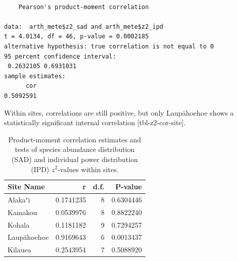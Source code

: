 \documentclass[
  letterpaper,
  DIV=11,
  numbers=noendperiod]{scrartcl}
\newenvironment{Shaded}{\begin{snugshade}}{\end{snugshade}}
\newcommand{\AttributeTok}[1]{\textcolor[rgb]{0.40,0.45,0.13}{#1}}
\newcommand{\CommentTok}[1]{\textcolor[rgb]{0.37,0.37,0.37}{#1}}
\newcommand{\ControlFlowTok}[1]{\textcolor[rgb]{0.00,0.23,0.31}{\textbf{#1}}}
\newcommand{\FunctionTok}[1]{\textcolor[rgb]{0.28,0.35,0.67}{#1}}
\newcommand{\NormalTok}[1]{\textcolor[rgb]{0.00,0.23,0.31}{#1}}
\newcommand{\OtherTok}[1]{\textcolor[rgb]{0.00,0.23,0.31}{#1}}
\newcommand{\SpecialCharTok}[1]{\textcolor[rgb]{0.37,0.37,0.37}{#1}}
\newcommand{\StringTok}[1]{\textcolor[rgb]{0.13,0.47,0.30}{#1}}
\begin{document}
\begin{verbatim}

    Pearson's product-moment correlation

data:  arth_mete$z2_sad and arth_mete$z2_ipd
t = 4.0134, df = 46, p-value = 0.0002185
alternative hypothesis: true correlation is not equal to 0
95 percent confidence interval:
 0.2632105 0.6931031
sample estimates:
      cor 
0.5092591 
\end{verbatim}

Within sites, correlations are still positive, but only Laupāhoehoe
shows a statistically significant internal correlation
{[}tbl-z2-cor-site{]}.

\begin{Shaded}
\end{Shaded}

\begin{longtable}[]{@{}lrrr@{}}

\caption{\label{tbl-z2-cor-site}Product-moment correlation estimates and
tests of species abundance distribution (SAD) and individual power
distribution (IPD) \(z^2\)-values within sites.}

\tabularnewline

\toprule\noalign{}
Site Name & r & d.f. & P-value \\
\midrule\noalign{}
\endhead
\bottomrule\noalign{}
\endlastfoot
Alakaʻi & 0.1741235 & 8 & 0.6304446 \\
Kamakou & 0.0539976 & 8 & 0.8822240 \\
Kohala & 0.1181182 & 9 & 0.7294257 \\
Laupāhoehoe & 0.9169643 & 6 & 0.0013437 \\
Kīlauea & 0.2543954 & 7 & 0.5088920 \\

\end{longtable}
\end{document}
